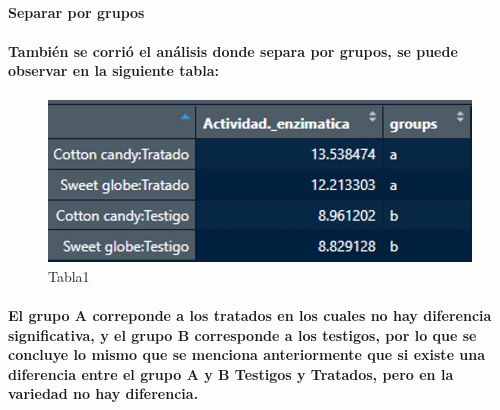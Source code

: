 \documentclass[
]{article}
\begin{document}
\hypertarget{separar-por-grupos}{%
\paragraph{Separar por grupos}\label{separar-por-grupos}}

\hypertarget{tambiuxe9n-se-corriuxf3-el-anuxe1lisis-donde-separa-por-grupos-se-puede-observar-en-la-siguiente-tabla}{%
\paragraph{También se corrió el análisis donde separa por grupos, se
puede observar en la siguiente
tabla:}\label{tambiuxe9n-se-corriuxf3-el-anuxe1lisis-donde-separa-por-grupos-se-puede-observar-en-la-siguiente-tabla}}

\begin{figure}
\centering
\includegraphics{Imagen1.jpg}
\caption{Tabla1}
\end{figure}

\hypertarget{el-grupo-a-correponde-a-los-tratados-en-los-cuales-no-hay-diferencia-significativa-y-el-grupo-b-corresponde-a-los-testigos-por-lo-que-se-concluye-lo-mismo-que-se-menciona-anteriormente-que-si-existe-una-diferencia-entre-el-grupo-a-y-b-testigos-y-tratados-pero-en-la-variedad-no-hay-diferencia.}{%
\paragraph{\texorpdfstring{El grupo \textbf{A} correponde a los tratados
en los cuales no hay diferencia significativa, y el grupo \textbf{B}
corresponde a los testigos, por lo que se concluye lo mismo que se
menciona anteriormente que \textbf{si} existe una diferencia entre el
grupo A y B \textbf{Testigos y Tratados}, pero en la variedad no hay
diferencia.}{El grupo A correponde a los tratados en los cuales no hay diferencia significativa, y el grupo B corresponde a los testigos, por lo que se concluye lo mismo que se menciona anteriormente que si existe una diferencia entre el grupo A y B Testigos y Tratados, pero en la variedad no hay diferencia.}}\label{el-grupo-a-correponde-a-los-tratados-en-los-cuales-no-hay-diferencia-significativa-y-el-grupo-b-corresponde-a-los-testigos-por-lo-que-se-concluye-lo-mismo-que-se-menciona-anteriormente-que-si-existe-una-diferencia-entre-el-grupo-a-y-b-testigos-y-tratados-pero-en-la-variedad-no-hay-diferencia.}}
\end{document}
